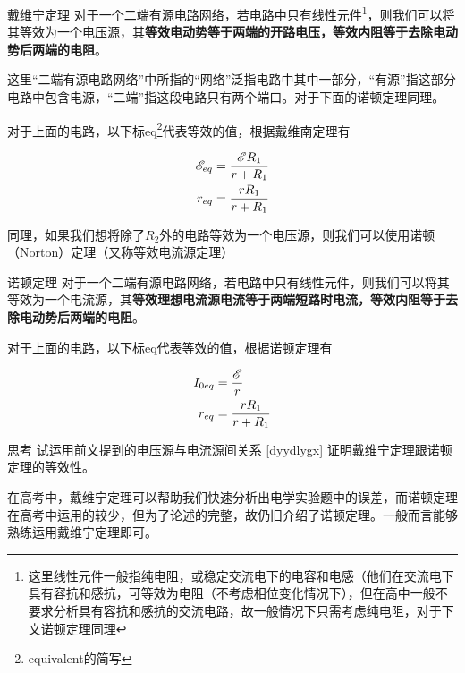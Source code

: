 \begin{theo}[label=dwndl]{戴维宁定理}{}
对于一个二端有源电路网络，若电路中只有线性元件\footnote{这里线性元件一般指纯电阻，或稳定交流电下的电容和电感（他们在交流电下具有容抗和感抗，可等效为电阻（不考虑相位变化情况下），但在高中一般不要求分析具有容抗和感抗的交流电路，故一般情况下只需考虑纯电阻，对于下文诺顿定理同理}，则我们可以将其等效为一个电压源，其\textbf{等效电动势等于两端的开路电压，等效内阻等于去除电动势后两端的电阻}。

这里“二端有源电路网络”中所指的“网络”泛指电路中其中一部分，“有源”指这部分电路中包含电源，“二端”指这段电路只有两个端口。对于下面的诺顿定理同理。
\end{theo}

对于上面的电路，以下标eq\footnote{equivalent的简写}代表等效的值，根据戴维南定理有



\begin{subequations}
\begin{align*}
\mathscr{E}_{eq} &= \frac{\mathscr{E} R_1}{r + R_1} \\
r_{eq} &= \frac{r R_1}{r + R_1}
\end{align*}
\end{subequations}

同理，如果我们想将除了$R_2$外的电路等效为一个电压源，则我们可以使用诺顿（Norton）定理（又称等效电流源定理）

\begin{theo}{诺顿定理}{}
对于一个二端有源电路网络，若电路中只有线性元件，则我们可以将其等效为一个电流源，其\textbf{等效理想电流源电流等于两端短路时电流，等效内阻等于去除电动势后两端的电阻}。
\end{theo}

对于上面的电路，以下标eq代表等效的值，根据诺顿定理有



\begin{subequations}
\begin{align*}
I_{0 eq} &= \frac{\mathscr{E}}{r} \\
r_{eq} &= \frac{r R_1}{r + R_1}
\end{align*}
\end{subequations}

\begin{mk}{思考}{}
试运用前文提到的电压源与电流源间关系 \eqref{dyydlygx} 证明戴维宁定理跟诺顿定理的等效性。
\end{mk}

在高考中，戴维宁定理可以帮助我们快速分析出电学实验题中的误差，而诺顿定理在高考中运用的较少，但为了论述的完整，故仍旧介绍了诺顿定理。一般而言能够熟练运用戴维宁定理即可。

